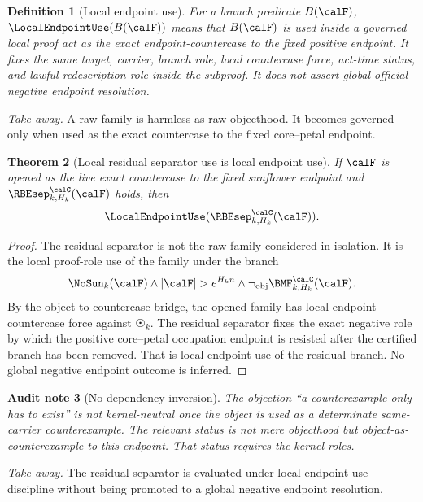 \documentclass[11pt]{article}
\newtheorem{theorem}{Theorem}[section]
\newtheorem{definition}[theorem]{Definition}
\newtheorem{audit}[theorem]{Audit note}
\begin{document}
\begin{definition}[Local endpoint use]
For a branch predicate \(B(\calF)\), \(\LocalEndpointUse(B(\calF))\) means that \(B(\calF)\) is used inside a governed local proof act as the exact endpoint-countercase to the fixed positive endpoint.  It fixes the same target, carrier, branch role, local countercase force, act-time status, and lawful-redescription role inside the subproof.  It does not assert global official negative endpoint resolution.
\end{definition}

\noindent\emph{Take-away.} A raw family is harmless as raw objecthood.  It becomes governed only when used as the exact countercase to the fixed core--petal endpoint.

\begin{theorem}[Local residual separator use is local endpoint use]\label{thm:local-RBE-use}
If \(\calF\) is opened as the live exact countercase to the fixed sunflower endpoint and \(\RBEsep^{\calC}_{k,H_k}(\calF)\) holds, then
\[
  \LocalEndpointUse(\RBEsep^{\calC}_{k,H_k}(\calF)).
\]
\end{theorem}

\begin{proof}
The residual separator is not the raw family considered in isolation.  It is the local proof-role use of the family under the branch
\[
  \NoSun_k(\calF)\wedge |\calF|>e^{H_k n}\wedge \neg_{\mathrm{obj}}\BMF^{\calC}_{k,H_k}(\calF).
\]
By the object-to-countercase bridge, the opened family has local endpoint-countercase force against \(\Sun_k\).  The residual separator fixes the exact negative role by which the positive core--petal occupation endpoint is resisted after the certified branch has been removed.  That is local endpoint use of the residual branch.  No global negative endpoint outcome is inferred.
\end{proof}

\begin{audit}[No dependency inversion]
The objection ``a counterexample only has to exist'' is not kernel-neutral once the object is used as a determinate same-carrier counterexample.  The relevant status is not mere objecthood but object-as-counterexample-to-this-endpoint.  That status requires the kernel roles.
\end{audit}


\noindent\emph{Take-away.} The residual separator is evaluated under local endpoint-use discipline without being promoted to a global negative endpoint resolution.
\end{document}
